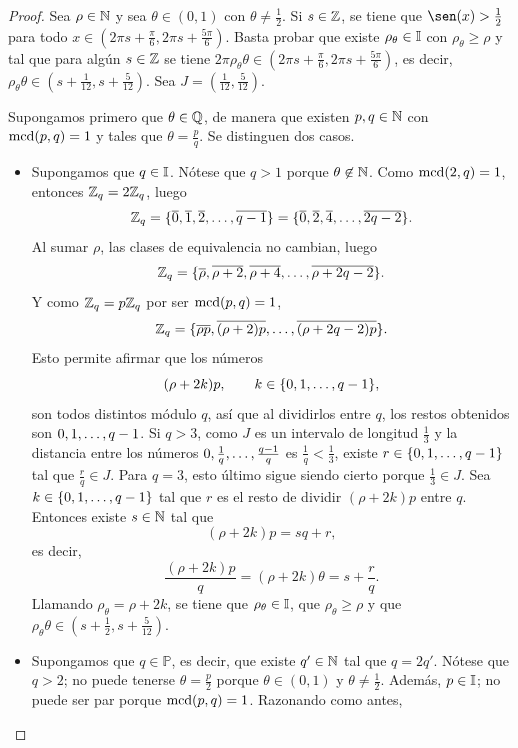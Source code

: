 \documentclass[a4paper, 12pt]{book}
\begin{document}
\begin{proof}
    Sea $\rho\in \mathbb N$ y sea $\theta \in (0,1)$ con $\theta\neq\frac{1}{2}$. Si $s \in \mathbb Z$, se tiene que $\sen(x) > \frac{1}{2}$ para todo $x \in (2\pi s+\frac{\pi}{6},2\pi s+\frac{5\pi}{6})$. Basta probar que existe $\rho_\theta \in \mathbb I$ con $\rho_\theta \geq \rho$ y tal que para algún $s \in \mathbb Z$ se tiene $2\pi\rho_\theta\theta \in (2\pi s +\frac{\pi}{6},2\pi s +\frac{5\pi}{6})$, es decir, $\rho_\theta\theta \in (s+\frac{1}{12},s+\frac{5}{12})$. Sea $J=(\frac{1}{12},\frac{5}{12})$.

    Supongamos primero que $\theta \in \mathbb Q$, de manera que existen $p,q \in \mathbb N$ con $\textup{mcd}(p,q) = 1$ y tales que $\theta = \frac{p}{q}$. Se distinguen dos casos.
    \begin{itemize}
        \item Supongamos que $q \in \mathbb I$. Nótese que $q > 1$ porque $\theta \not\in\mathbb N$. Como $\textup{mcd}(2,q) = 1$, entonces $\mathbb Z_q = 2\mathbb Z_q$, luego
        \[\mathbb Z_q = \{\overline{0},\overline{1},\overline{2},\mathellipsis,\overline{q-1}\} = \{\overline{0},\overline{2},\overline{4},\mathellipsis,\overline{2q-2}\}.\]
        Al sumar $\rho$, las clases de equivalencia no cambian, luego
        \[\mathbb Z_q= \{\overline{\rho},\overline{\rho+2},\overline{\rho+4},\mathellipsis,\overline{\rho+2q-2}\}.\]
        Y como $\mathbb Z_q = p\mathbb Z_q$ por ser $\textup{mcd}(p,q) = 1$,
        \[\mathbb Z_q = \{\overline{\rho p},\overline{(\rho+2)p},\mathellipsis,\overline{(\rho+2q-2)p}\}.\]
        Esto permite afirmar que los números 
        \[(\rho+2k)p, \qquad k \in \{0,1,\mathellipsis,q-1\},\]
        son todos distintos módulo $q$, así que al dividirlos entre $q$, los restos obtenidos son $0,1,\mathellipsis,q-1$. Si $q > 3$, como $J$ es un intervalo de longitud $\frac{1}{3}$ y la distancia entre los números $0,\frac{1}{q},\mathellipsis,\frac{q-1}{q}$ es $\frac{1}{q} < \frac{1}{3}$, existe $r \in \{0,1,\mathellipsis,q-1\}$ tal que $\frac{r}{q} \in J$. Para $q = 3$, esto último sigue siendo cierto porque $\frac{1}{3} \in J$. Sea $k \in \{0,1,\mathellipsis,q-1\}$ tal que $r$ es el resto de dividir $(\rho+2k)p$ entre $q$. Entonces existe $s \in \mathbb N$ tal que
        \[(\rho+2k)p = sq + r,\]
        es decir,
        \[\frac{(\rho+2k)p}{q} = (\rho+2k)\theta = s + \frac{r}{q}.\]
        Llamando $\rho_\theta = \rho+2k$, se tiene que $\rho_\theta \in \mathbb I$, que $\rho_\theta \geq \rho$ y que $\rho_\theta\theta \in (s+\frac{1}{2},s+\frac{5}{12})$.
        \item Supongamos que $q \in \mathbb{P}$, es decir, que existe $q'\in\mathbb N$ tal que $q = 2q'$. Nótese que $q > 2$; no puede tenerse $\theta = \frac{p}{2}$ porque $\theta \in (0,1)$ y $\theta \neq \frac{1}{2}$. Además, $p \in \mathbb I$; no puede ser par porque $\textup{mcd}(p,q) = 1$. Razonando como antes,

\end{itemize}
\end{proof}
\end{document}
